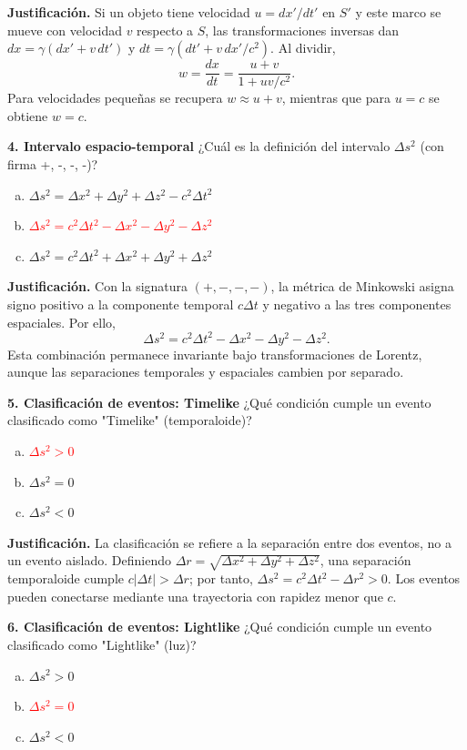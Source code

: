 \textbf{Justificación.} Si un objeto tiene velocidad $u=dx'/dt'$ en $S'$ y este marco se mueve con velocidad $v$ respecto a $S$, las transformaciones inversas dan $dx=\gamma(dx'+v\,dt')$ y $dt=\gamma(dt'+v\,dx'/c^2)$. Al dividir,
\[
w=\frac{dx}{dt}=\frac{u+v}{1+uv/c^2}.
\]
Para velocidades pequeñas se recupera $w\approx u+v$, mientras que para $u=c$ se obtiene $w=c$.

\textbf{4. Intervalo espacio-temporal}
¿Cuál es la definición del intervalo $\Delta s^2$ (con firma +, -, -, -)?
\begin{enumerate}[a)]
    \item $\Delta s^2 = \Delta x^2 + \Delta y^2 + \Delta z^2 - c^2\Delta t^2$
    \item \textcolor{red}{$\Delta s^2 = c^2\Delta t^2 - \Delta x^2 - \Delta y^2 - \Delta z^2$}
    \item $\Delta s^2 = c^2\Delta t^2 + \Delta x^2 + \Delta y^2 + \Delta z^2$
\end{enumerate}

\textbf{Justificación.} Con la signatura $(+,-,-,-)$, la métrica de Minkowski asigna signo positivo a la componente temporal $c\Delta t$ y negativo a las tres componentes espaciales. Por ello,
\[
\Delta s^2=c^2\Delta t^2-\Delta x^2-\Delta y^2-\Delta z^2.
\]
Esta combinación permanece invariante bajo transformaciones de Lorentz, aunque las separaciones temporales y espaciales cambien por separado.

\textbf{5. Clasificación de eventos: Timelike}
¿Qué condición cumple un evento clasificado como "Timelike" (temporaloide)?
\begin{enumerate}[a)]
    \item \textcolor{red}{$\Delta s^2 > 0$}
    \item $\Delta s^2 = 0$
    \item $\Delta s^2 < 0$
\end{enumerate}

\textbf{Justificación.} La clasificación se refiere a la separación entre dos eventos, no a un evento aislado. Definiendo $\Delta r=\sqrt{\Delta x^2+\Delta y^2+\Delta z^2}$, una separación temporaloide cumple $c|\Delta t|>\Delta r$; por tanto, $\Delta s^2=c^2\Delta t^2-\Delta r^2>0$. Los eventos pueden conectarse mediante una trayectoria con rapidez menor que $c$.

\textbf{6. Clasificación de eventos: Lightlike}
¿Qué condición cumple un evento clasificado como "Lightlike" (luz)?
\begin{enumerate}[a)]
    \item $\Delta s^2 > 0$
    \item \textcolor{red}{$\Delta s^2 = 0$}
    \item $\Delta s^2 < 0$
\end{enumerate}

